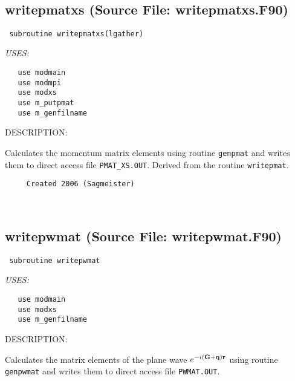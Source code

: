 \documentclass[11pt]{article}
\begin{document}

 
 
\mbox{}\hrulefill\ 
 
\subsection{writepmatxs (Source File: writepmatxs.F90)}


\begin{verbatim} subroutine writepmatxs(lgather)\end{verbatim}{\em USES:}
\begin{verbatim}   use modmain
   use modmpi
   use modxs
   use m_putpmat
   use m_genfilname\end{verbatim}
{\sf DESCRIPTION:\\ }


     Calculates the momentum matrix elements using routine {\tt genpmat} and
     writes them to direct access file {\tt PMAT\_XS.OUT}. Derived from
     the routine {\tt writepmat}.
  
\begin{verbatim}     Created 2006 (Sagmeister)\end{verbatim}


 
 
\mbox{}\hrulefill\ 
 
\subsection{writepwmat (Source File: writepwmat.F90)}


\begin{verbatim} subroutine writepwmat\end{verbatim}{\em USES:}
\begin{verbatim}   use modmain
   use modxs
   use m_genfilname\end{verbatim}
{\sf DESCRIPTION:\\ }


     Calculates the matrix elements of the plane wave
     $e^{-i({\bf G}+{\bf q}){\bf r}}$
     using routine {\tt genpwmat} and writes them to
     direct access file {\tt PWMAT.OUT}.
  
\end{document}
